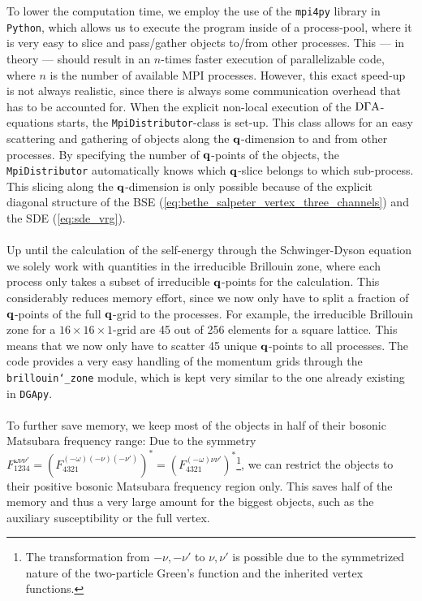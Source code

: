 \documentclass[../../main.tex]{subfiles}
\begin{document}
To lower the computation time, we employ the use of the \texttt{mpi4py} library in \texttt{Python}, which allows us to execute the program inside of a process-pool, where it is very easy to slice and pass/gather objects to/from other processes. This --- in theory --- should result in an $n$-times faster execution of parallelizable code, where $n$ is the number of available MPI processes. However, this exact speed-up is not always realistic, since there is always some communication overhead that has to be accounted for. When the explicit non-local execution of the $\text{D}\Gamma\text{A}$-equations starts, the \texttt{MpiDistributor}-class is set-up. This class allows for an easy scattering and gathering of objects along the $\textbf{q}$-dimension to and from other processes. By specifying the number of $\textbf{q}$-points of the objects, the \texttt{MpiDistributor} automatically knows which $\textbf{q}$-slice belongs to which sub-process. This slicing along the $\textbf{q}$-dimension is only possible because of the explicit diagonal structure of the BSE (\ref{eq:bethe_salpeter_vertex_three_channels}) and the SDE (\ref{eq:sde_vrg}). 
\\\\
Up until the calculation of the self-energy through the Schwinger-Dyson equation we solely work with quantities in the irreducible Brillouin zone, where each process only takes a subset of irreducible $\textbf{q}$-points for the calculation. This considerably reduces memory effort, since we now only have to split a fraction of $\textbf{q}$-points of the full $\textbf{q}$-grid to the processes. For example, the irreducible Brillouin zone for a $16\times16\times1$-grid are 45 out of 256 elements for a square lattice. This means that we now only have to scatter 45 unique $\textbf{q}$-points to all processes. The code provides a very easy handling of the momentum grids through the \texttt{brillouin\char`_zone} module, which is kept very similar to the one already existing in \texttt{DGApy}.
\\\\
To further save memory, we keep most of the objects in half of their bosonic Matsubara frequency range: Due to the symmetry $F^{\omega\nu\nu'}_{\mathfrak{1234}}=(F^{(-\omega)(-\nu)(-\nu')}_{\mathfrak{4321}})^{*}=(F^{(-\omega)\nu\nu'}_{\mathfrak{4321}})^{*}$\footnote{The transformation from $-\nu, -\nu'$ to $\nu,\nu'$ is possible due to the symmetrized nature of the two-particle Green's function and the inherited vertex functions.}, we can restrict the objects to their positive bosonic Matsubara frequency region only. This saves half of the memory and thus a very large amount for the biggest objects, such as the auxiliary susceptibility or the full vertex.
\end{document}

